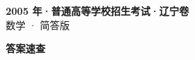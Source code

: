 \documentclass[zihao=-4, a4paper]{ctexart}
\begin{document}
\begin{center}
  {\Large\bfseries 2005 年·普通高等学校招生考试·辽宁卷}\\[4pt]
  {\large 数学 · 简答版}
\end{center}
\medskip
{}

\clearpage
{}
\begin{center}{\Large\bfseries 答案速查}\end{center}
\medskip

\end{document}
